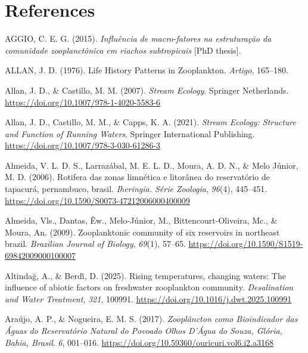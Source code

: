 \documentclass[
  letterpaper,
  DIV=11,
  numbers=noendperiod]{scrartcl}
\newlength{\cslhangindent}
\newenvironment{CSLReferences}[2] %
 {\begin{list}{}{%
  \setlength{\itemindent}{0pt}
  \setlength{\leftmargin}{0pt}
  \setlength{\parsep}{0pt}
  \ifodd #1
   \setlength{\leftmargin}{\cslhangindent}
   \setlength{\itemindent}{-1\cslhangindent}
  \fi
  \setlength{\itemsep}{#2\baselineskip}}}
 {\end{list}}
\begin{document}
\section*{References}\label{references}

\label{refs}
\begin{CSLReferences}{1}{0}
AGGIO, C. E. G. (2015). \emph{Influência de macro-fatores na
estruturação da comunidade zooplanctônica em riachos subtropicais}
{[}PhD thesis{]}.

ALLAN, J. D. (1976). Life History Patterns in Zooplankton.
\emph{Artigo}, 165--180.

Allan, J. D., \& Castillo, M. M. (2007). \emph{Stream Ecology}. Springer
Netherlands. \url{https://doi.org/10.1007/978-1-4020-5583-6}

Allan, J. D., Castillo, M. M., \& Capps, K. A. (2021). \emph{Stream
Ecology: Structure and Function of Running Waters}. Springer
International Publishing.
\url{https://doi.org/10.1007/978-3-030-61286-3}

Almeida, V. L. D. S., Larrazábal, M. E. L. D., Moura, A. D. N., \& Melo
Júnior, M. D. (2006). Rotifera das zonas limnética e litorânea do
reservatório de tapacurá, pernambuco, brasil. \emph{Iheringia. Série
Zoologia}, \emph{96}(4), 445--451.
\url{https://doi.org/10.1590/S0073-47212006000400009}

Almeida, Vls., Dantas, Êw., Melo-Júnior, M., Bittencourt-Oliveira, Mc.,
\& Moura, An. (2009). Zooplanktonic community of six reservoirs in
northeast brazil. \emph{Brazilian Journal of Biology}, \emph{69}(1),
57--65. \url{https://doi.org/10.1590/S1519-69842009000100007}

Altindağ, A., \& Berdi̇, D. (2025). Rising temperatures, changing waters:
The influence of abiotic factors on freshwater zooplankton community.
\emph{Desalination and Water Treatment}, \emph{321}, 100991.
\url{https://doi.org/10.1016/j.dwt.2025.100991}

Araújo, A. P., \& Nogueira, E. M. S. (2017). \emph{Zooplâncton como
Bioindicador das Águas do Reservatório Natural do Povoado Olhos D{'}Água
do Souza, Glória, Bahia, Brasil}. \emph{6}, 001--016.
\url{https://doi.org/10.59360/ouricuri.vol6.i2.a3168}


\end{CSLReferences}
\end{document}
